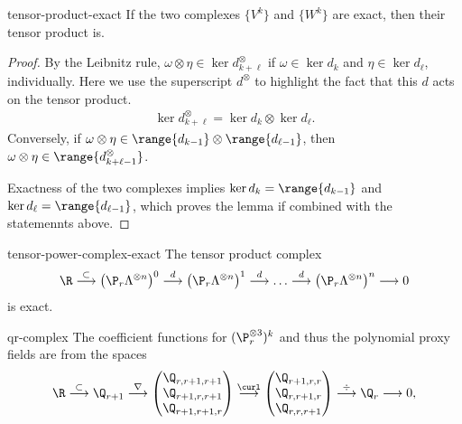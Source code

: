 \begin{Lemma}{tensor-product-exact}
  If the two complexes $\{V^k\}$ and $\{W^k\}$ are exact, then their tensor product is.
\end{Lemma}

\begin{proof}
  By the Leibnitz rule,
  $\omega\otimes\eta \in \ker{d_{k+\ell}^\otimes}$ if
  $\omega\in\ker{d_k}$ and $\eta\in\ker{d_\ell}$, individually. Here
  we use the superscript $d^\otimes$ to highlight the fact that this
  $d$ acts on the tensor product.
  \begin{gather}
    \ker{d_{k+\ell}^\otimes} = \ker{d_k} \otimes \ker{d_\ell}.
  \end{gather}
  Conversely, if $\omega\otimes\eta\in\range{d_{k-1}}\otimes \range{d_{\ell-1}}$,
  then $\omega\otimes\eta\in\range{d_{k+\ell-1}^\otimes}$.

  Exactness of the two complexes implies $\ker{d_k} = \range{d_{k-1}}$
  and $\ker{d_\ell} = \range{d_{\ell-1}}$, which proves the lemma if
  combined with the statemennts above.
\end{proof}

\begin{Corollary}{tensor-power-complex-exact}
  The tensor product complex
  \begin{gather}
    \R
    \overset{\subset}{\longrightarrow}
    \left(\P_r\Lambda^{\otimes n}\right)^0
    \overset{d}{\longrightarrow}    
    \left(\P_r\Lambda^{\otimes n}\right)^1
    \overset{d}{\longrightarrow}
    \dots
    \overset{d}{\longrightarrow}    
    \left(\P_r\Lambda^{\otimes n}\right)^n
    \longrightarrow 0
  \end{gather}
  is exact.
\end{Corollary}

\begin{Lemma}{qr-complex}
  The coefficient functions for $(\P_r^{\otimes 3})^k$ and thus the
  polynomial proxy fields are from the spaces
  \begin{gather}
    \R
    \overset{\subset}{\longrightarrow} \Q_{r+1}
    \overset{\nabla}{\longrightarrow}
    \begin{pmatrix}
      \Q_{r,r+1,r+1}\\\Q_{r+1,r,r+1}\\\Q_{r+1,r+1,r}
    \end{pmatrix}
    \overset{\curl}{\longrightarrow}
    \begin{pmatrix}
      \Q_{r+1,r,r}\\\Q_{r,r+1,r}\\\Q_{r,r,r+1}
    \end{pmatrix}
    \overset{\div}{\longrightarrow}
    \Q_r
    \longrightarrow 0,    
  \end{gather}
\end{Lemma}


